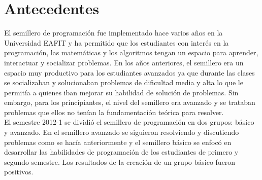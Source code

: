 \documentclass[11pt, oneside]{article}
\theoremstyle{definition}
\theoremstyle{remark}
\begin{document}
\section{Antecedentes}
El semillero de programación fue implementado hace varios años en la Universidad EAFIT y ha permitido que los estudiantes con interés en la programación, las matemáticas y los algoritmos tengan un espacio para aprender, interactuar y socializar problemas. En los años anteriores, el semillero era un espacio muy productivo para los estudiantes avanzados ya que durante las clases se socializaban y solucionaban problemas de dificultad media y alta lo que le permitía a quienes iban mejorar su habilidad de solución de problemas. Sin embargo, para los principiantes, el nivel del semillero era avanzado y se trataban problemas que ellos no tenían la fundamentación teórica para resolver.\\
El semestre 2012-1 se dividió el semillero de programación en dos grupos: básico y avanzado. En el semillero avanzado se siguieron resolviendo y discutiendo problemas como se hacía anteriormente y el semillero básico se enfocó en desarrollar las habilidades de programación de los estudiantes de primero y segundo semestre. Los resultados de la creación de un grupo básico fueron positivos.\\
\end{document}
